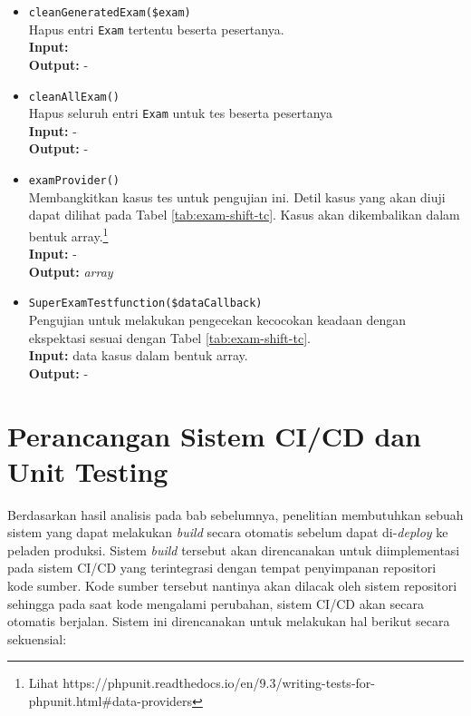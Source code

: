 \begin{itemize}
\begin{itemize}
                    \item \texttt{cleanGeneratedExam(\$exam)} \\
                        Hapus entri \texttt{Exam} tertentu beserta pesertanya.\\
                        \textbf{Input:} \\
                        \textbf{Output:} -
                    
                    \item \texttt{cleanAllExam()} \\
                        Hapus seluruh entri \texttt{Exam} untuk tes beserta pesertanya\\
                        \textbf{Input:} -\\
                        \textbf{Output:} -
                    
                    \item \texttt{examProvider()} \\
                        Membangkitkan kasus tes untuk pengujian ini. Detil kasus yang akan diuji
                        dapat dilihat pada Tabel \ref{tab:exam-shift-tc}. Kasus akan dikembalikan dalam
                        bentuk array.\footnote{Lihat 
                        https://phpunit.readthedocs.io/en/9.3/writing-tests-for-phpunit.html\#data-providers}\\
                        \textbf{Input:} -\\
                        \textbf{Output:} \textit{array}
                        
                    
                    \item \texttt{SuperExamTestfunction(\$dataCallback)} \\
                        Pengujian untuk melakukan pengecekan kecocokan keadaan dengan ekspektasi
                        sesuai dengan Tabel \ref{tab:exam-shift-tc}.\\
                        \textbf{Input:} data kasus dalam bentuk array.\\
                        \textbf{Output:} -
                \end{itemize}
    \end{itemize}

\section{Perancangan Sistem CI/CD dan Unit Testing}
    Berdasarkan hasil analisis pada bab sebelumnya, penelitian membutuhkan sebuah sistem yang dapat
    melakukan \textit{build} secara otomatis sebelum dapat di-\textit{deploy} ke peladen produksi.
    Sistem \textit{build} tersebut akan direncanakan untuk diimplementasi pada sistem CI/CD yang
    terintegrasi dengan tempat penyimpanan repositori kode sumber. 
    Kode sumber tersebut nantinya akan
    dilacak oleh sistem repositori sehingga pada saat kode mengalami perubahan, sistem CI/CD akan
    secara otomatis berjalan. Sistem ini direncanakan untuk melakukan hal berikut secara sekuensial:
    
